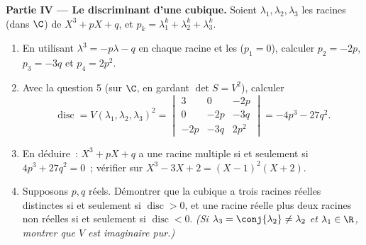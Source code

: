 \begin{problem}
\medskip
\noindent\textbf{Partie IV --- Le discriminant d'une cubique.}
Soient $\lambda_1, \lambda_2, \lambda_3$ les racines (dans $\C$) de
$X^3 + pX + q$, et $p_k = \lambda_1^k + \lambda_2^k + \lambda_3^k$.
\begin{enumerate}[resume]
  \item En utilisant $\lambda^3 = -p\lambda - q$ en chaque racine et
        les  ($p_1 = 0$), calculer $p_2 = -2p$,
        $p_3 = -3q$ et $p_4 = 2p^2$.
  \item Avec la question 5 (sur $\C$, en gardant $\det S = V^2$),
        calculer
        \[
        \operatorname{disc} = V(\lambda_1, \lambda_2,
        \lambda_3)^2 = \begin{vmatrix}
        3 & 0 & -2p\\
        0 & -2p & -3q\\
        -2p & -3q & 2p^2
        \end{vmatrix}
        = -4p^3 - 27q^2 .
        \]
  \item En déduire~: $X^3 + pX + q$ a une racine multiple si et
        seulement si $4p^3 + 27q^2 = 0$~; vérifier sur $X^3 - 3X + 2 =
        (X - 1)^2(X + 2)$.
  \item Supposons $p, q$ réels. Démontrer que la cubique a trois
        racines réelles distinctes si et seulement si
        $\operatorname{disc} > 0$, et une racine réelle plus deux
        racines  non réelles si et seulement si
        $\operatorname{disc} < 0$. \emph{(Si
        $\lambda_3 = \conj{\lambda_2} \neq \lambda_2$ et
        $\lambda_1 \in \R$, montrer que $V$ est imaginaire pur.)}
\end{enumerate}


\end{problem}
